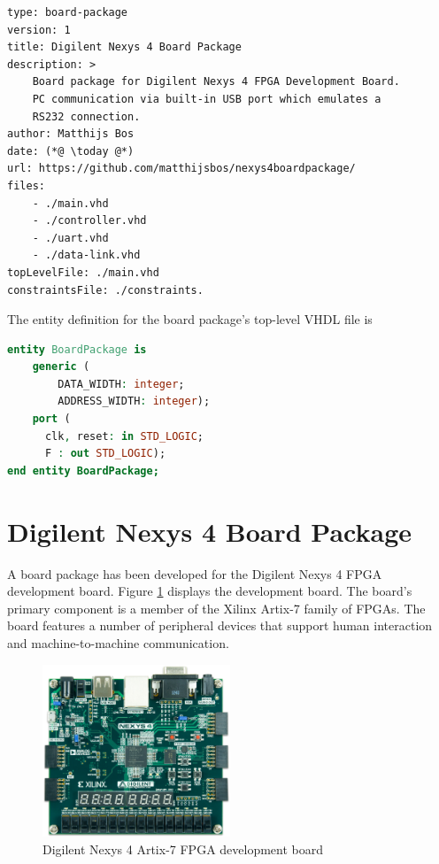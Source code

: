 \documentclass[main.tex]{subfiles}
\begin{document}
\begin{lstlisting}[caption={Example board package \texttt{manifest.yaml}}, label={lst:board-package-manifest}]
type: board-package
version: 1
title: Digilent Nexys 4 Board Package
description: >
    Board package for Digilent Nexys 4 FPGA Development Board. 
    PC communication via built-in USB port which emulates a
    RS232 connection.
author: Matthijs Bos
date: (*@ \today @*)
url: https://github.com/matthijsbos/nexys4boardpackage/
files: 
    - ./main.vhd
    - ./controller.vhd
    - ./uart.vhd
    - ./data-link.vhd
topLevelFile: ./main.vhd
constraintsFile: ./constraints.
\end{lstlisting}

The entity definition for the board package's top-level VHDL file is 

\begin{lstlisting}[language=vhdl, caption={Top-level VHDL file entity specification.}]
entity BoardPackage is
    generic (
        DATA_WIDTH: integer;
        ADDRESS_WIDTH: integer);
    port (
      clk, reset: in STD_LOGIC;
      F : out STD_LOGIC);
end entity BoardPackage;
\end{lstlisting}



\section{Digilent Nexys 4 Board Package}
A board package has been developed for the Digilent Nexys 4 FPGA development board. Figure \ref{fig:nexys4} displays the development board. The board's primary component is a member of the Xilinx Artix-7 family of FPGAs. The board features a number of peripheral devices that support human interaction and machine-to-machine communication. 

\begin{figure}[h]
\centering
\includegraphics[width=0.5\textwidth]{img/nexys4-small}
\caption{Digilent Nexys 4 Artix-7 FPGA development board}
\label{fig:nexys4}
\end{figure}
\end{document}
